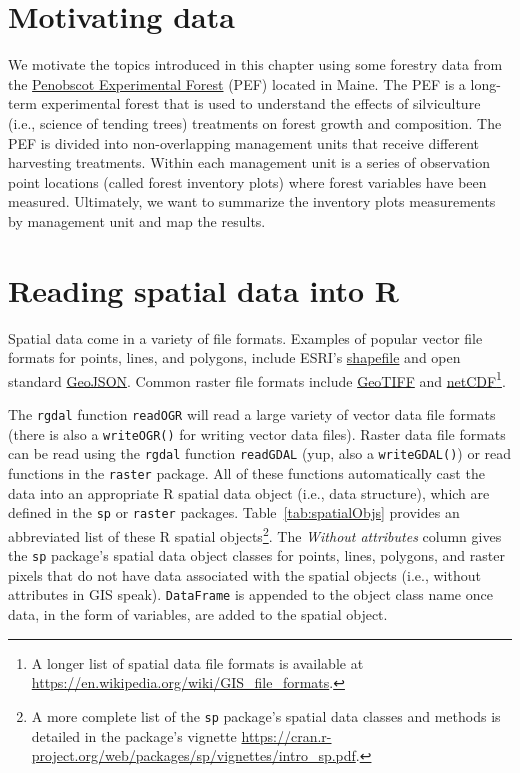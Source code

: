\documentclass[12pt,oneside]{book}\usepackage[]{graphicx}\usepackage[]{color}
\begin{document}
\section{Motivating data}
We motivate the topics introduced in this chapter using some forestry data from the \href{https://www.nrs.fs.fed.us/ef/locations/me/penobscot}{Penobscot Experimental Forest} (PEF) located in Maine. The PEF is a long-term experimental forest that is used to understand the effects of silviculture (i.e., science of tending trees) treatments on forest growth and composition. The PEF is divided into non-overlapping management units that receive different harvesting treatments. Within each management unit is a series of observation point locations (called forest inventory plots) where forest variables have been measured. Ultimately, we want to summarize the inventory plots measurements by management unit and map the results. 

\section{Reading spatial data into R}

Spatial data come in a variety of file formats. Examples of popular vector file formats for points, lines, and polygons, include ESRI's \href{https://en.wikipedia.org/wiki/Shapefile}{shapefile} and open standard \href{https://en.wikipedia.org/wiki/GeoJSON}{GeoJSON}. Common raster file formats include \href{https://en.wikipedia.org/wiki/GeoTIFF}{GeoTIFF} and \href{https://en.wikipedia.org/wiki/NetCDF}{netCDF}\footnote{A longer list of spatial data file formats is available at \url{https://en.wikipedia.org/wiki/GIS_file_formats}.}.

The \verb+rgdal+ function \verb+readOGR+ will read a large variety of vector data file formats (there is also a \verb+writeOGR()+ for writing vector data files). Raster data file formats can be read using the \verb+rgdal+ function \verb+readGDAL+ (yup, also a \verb+writeGDAL()+) or read functions in the \verb+raster+ package. All of these functions automatically cast the data into an appropriate R spatial data object (i.e., data structure), which are defined in the \verb+sp+ or \verb+raster+ packages. Table~\ref{tab:spatialObjs} provides an abbreviated list of these R spatial objects\footnote{A more complete list of the \texttt{sp} package's spatial data classes and methods is detailed in the package's vignette \url{https://cran.r-project.org/web/packages/sp/vignettes/intro_sp.pdf}.}. The \emph{Without attributes} column gives the \verb+sp+ package's spatial data object classes for points, lines, polygons, and raster pixels that do not have data associated with the spatial objects (i.e., without attributes in GIS speak). \verb+DataFrame+ is appended to the object class name once data, in the form of variables, are added to the spatial object.
\end{document}
